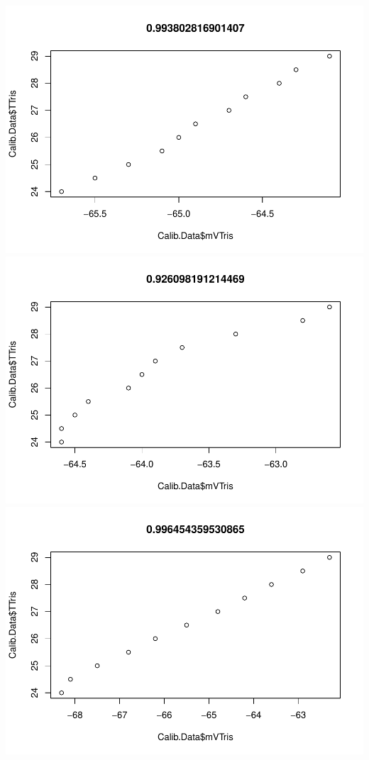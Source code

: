 \documentclass[
]{article}
\begin{document}
\includegraphics{daily-measurements_files/figure-latex/unnamed-chunk-5-4.pdf}
\includegraphics{daily-measurements_files/figure-latex/unnamed-chunk-5-5.pdf}
\includegraphics{daily-measurements_files/figure-latex/unnamed-chunk-5-6.pdf}
\end{document}
